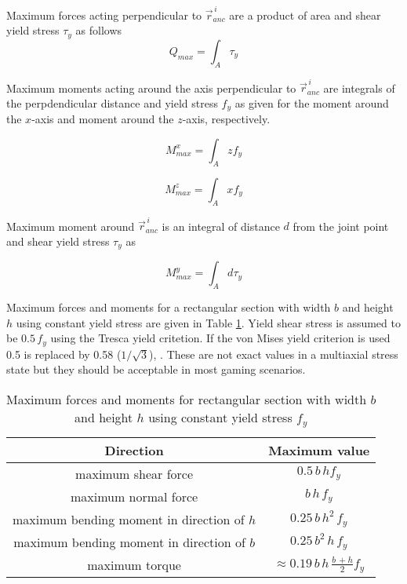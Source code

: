 Maximum forces acting perpendicular to $\vec{r}_{anc}^{\,i} $
are a product of area and shear yield stress $\tau_y$ as follows
\begin{equation} \label{eq:fQ}
Q_{max}= \int_A \tau_y
\end{equation}

Maximum moments acting around the axis perpendicular to $\vec{r}_{anc}^{\,i} $
are integrals of the perpdendicular distance 
and yield stress $f_y$ as given for the moment around the $x$-axis 
and moment around the $z$-axis, respectively.

\begin{equation} \label{eq:Mx}
M_{max}^x= \int_A z f_y
\end{equation}

\begin{equation} \label{eq:Mz}
M_{max}^z= \int_A x f_y
\end{equation}

Maximum moment around $\vec{r}_{anc}^{\,i} $
is an integral of distance $d$ from the joint point
and shear yield stress $\tau_y$ as 

\begin{equation} \label{eq:My}
M_{max}^y= \int_A d \tau_y
\end{equation}

Maximum forces and moments for a
rectangular section with width $b$ and height $h$ using constant yield stress
are given in Table \ref{tab:maxForces}.
Yield shear stress is assumed to be $ 0.5\, f_y$ using the Tresca yield critetion.
If the von Mises yield criterion is used 0.5 is replaced by 0.58 ($1/\sqrt{3}$), \cite{dowling}.
These are not exact values in a multiaxial stress state but they
should be acceptable in most gaming scenarios.

\begin {table}
\caption {Maximum forces and moments for 
rectangular section with width $b$ and height $h$ using constant yield stress $f_y$}
\label{tab:maxForces} 
\begin{center}
\begin{tabular}{| c| c|}
\hline
{\bf Direction} & {\bf Maximum value}  \\ \hline
maximum shear force & $0.5\, b\, h f_y$ \\ \hline
maximum normal force & $b\, h\, f_y$  \\ \hline
maximum bending moment in direction of $h$& $0.25\, b\, h^2 \, f_y$  \\ \hline
maximum bending moment in direction of $b$ & $0.25\, b^2\, h\, f_y$  \\ \hline
maximum torque & $ \approx 0.19\, b\, h\, \frac{b\, + h}{2} f_y$  \\ \hline
\end{tabular}
\end{center}
\end {table}

